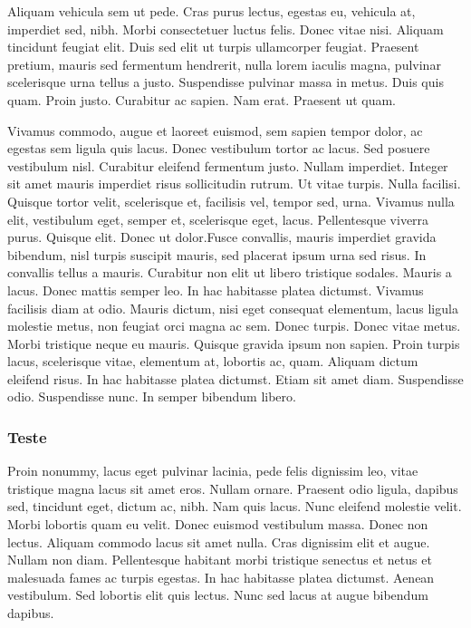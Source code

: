 Aliquam vehicula sem ut pede. Cras purus lectus, egestas eu, vehicula at, imperdiet sed, nibh. Morbi consectetuer luctus felis. Donec vitae nisi. Aliquam tincidunt feugiat elit. Duis sed elit ut turpis ullamcorper feugiat. Praesent pretium, mauris sed fermentum hendrerit, nulla lorem iaculis magna, pulvinar scelerisque urna tellus a justo. Suspendisse pulvinar massa in metus. Duis quis quam. Proin justo. Curabitur ac sapien. Nam erat. Praesent ut quam.

Vivamus commodo, augue et laoreet euismod, sem sapien tempor dolor, ac egestas sem ligula quis lacus. Donec vestibulum tortor ac lacus. Sed posuere vestibulum nisl. Curabitur eleifend fermentum justo. Nullam imperdiet. Integer sit amet mauris imperdiet risus sollicitudin rutrum. Ut vitae turpis. Nulla facilisi. Quisque tortor velit, scelerisque et, facilisis vel, tempor sed, urna. Vivamus nulla elit, vestibulum eget, semper et, scelerisque eget, lacus. Pellentesque viverra purus. Quisque elit. Donec ut dolor.Fusce convallis, mauris imperdiet gravida bibendum, nisl turpis suscipit mauris, sed placerat ipsum urna sed risus. In convallis tellus a mauris. Curabitur non elit ut libero tristique sodales. Mauris a lacus. Donec mattis semper leo. In hac habitasse platea dictumst. Vivamus facilisis diam at odio. Mauris dictum, nisi eget consequat elementum, lacus ligula molestie metus, non feugiat orci magna ac sem. Donec turpis. Donec vitae metus. Morbi tristique neque eu mauris. Quisque gravida ipsum non sapien. Proin turpis lacus, scelerisque vitae, elementum at, lobortis ac, quam. Aliquam dictum eleifend risus. In hac habitasse platea dictumst. Etiam sit amet diam. Suspendisse odio. Suspendisse nunc. In semper bibendum libero.

\subsubsection{Teste}
Proin nonummy, lacus eget pulvinar lacinia, pede felis dignissim leo, vitae tristique magna lacus sit amet eros. Nullam ornare. Praesent odio ligula, dapibus sed, tincidunt eget, dictum ac, nibh. Nam quis lacus. Nunc eleifend molestie velit. Morbi lobortis quam eu velit. Donec euismod vestibulum massa. Donec non lectus. Aliquam commodo lacus sit amet nulla. Cras dignissim elit et augue. Nullam non diam. Pellentesque habitant morbi tristique senectus et netus et malesuada fames ac turpis egestas. In hac habitasse platea dictumst. Aenean vestibulum. Sed lobortis elit quis lectus. Nunc sed lacus at augue bibendum dapibus.


